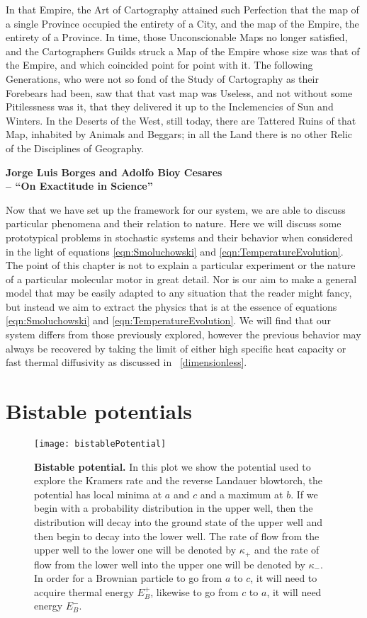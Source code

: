 \setlength{}
\epigraph{In that Empire, the Art of Cartography attained such Perfection that the map of a single Province occupied the entirety of a City, and the map of the Empire, the entirety of a Province. In time, those Unconscionable Maps no longer satisfied, and the Cartographers Guilds struck a Map of the Empire whose size was that of the Empire, and which coincided point for point with it. The following Generations, who were not so fond of the Study of Cartography as their Forebears had been, saw that that vast map was Useless, and not without some Pitilessness was it, that they delivered it up to the Inclemencies of Sun and Winters. In the Deserts of the West, still today, there are Tattered Ruins of that Map, inhabited by Animals and Beggars; in all the Land there is no other Relic of the Disciplines of Geography.}{\textbf{Jorge Luis Borges and Adolfo Bioy Cesares \\ -- ``On Exactitude in Science''}}

Now that we have set up the framework for our system, we are able to discuss particular phenomena and their relation to nature. Here we will discuss some prototypical problems in stochastic systems and their behavior when considered in the light of equations \ref{eqn:Smoluchowski} and \ref{eqn:TemperatureEvolution}. The point of this chapter is not to explain a particular experiment or the nature of a particular molecular motor in great detail. Nor is our aim to make a general model that may be easily adapted to any situation that the reader might fancy, but instead we aim to extract the physics that is at the essence of equations \ref{eqn:Smoluchowski} and \ref{eqn:TemperatureEvolution}. We will find that our system differs from those previously explored, however the previous behavior may always be recovered by taking the limit of either high specific heat capacity or fast thermal diffusivity as discussed in ~\autoref{dimensionless}.

\section{Bistable potentials} \label{Kramers}

\begin{figure}[tb]
\texttt{[image: bistablePotential]}
\caption{\textbf{Bistable potential.} In this plot we show the potential used to explore the Kramers rate and the reverse Landauer blowtorch, the potential has local minima at $a$ and $c$ and a maximum at $b$. If we begin with a probability distribution in the upper well, then the distribution will decay into the ground state of the upper well and then begin to decay into the lower well. The rate of flow from the upper well to the lower one will be denoted by $\kappa_+$ and the rate of flow from the lower well into the upper one will be denoted by $\kappa_-$. In order for a Brownian particle to go from $a$ to $c$, it will need to acquire thermal energy $E_B^+$, likewise to go from $c$ to $a$, it will need energy $E_B^-$.}
\label{fig:bistablePotential}
\end{figure}

